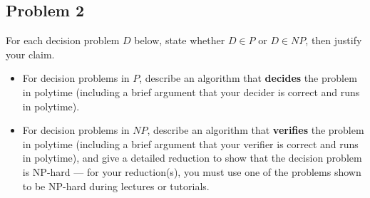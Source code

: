 \documentclass[11pt]{article}
\begin{document}
\subsection*{Problem 2}

For each decision problem $D$ below, state whether $D \in P$ or $D \in NP$, then justify your claim.
\begin{itemize}
    \item For decision problems in $P$, describe an algorithm that \textbf{decides} the problem in polytime (including a brief argument that your decider is correct and runs in polytime).
    \item For decision problems in $NP$, describe an algorithm that \textbf{verifies} the problem in polytime (including a brief argument that your verifier is correct and runs in polytime), and give a detailed reduction to show that the decision problem is NP-hard — for your reduction(s), you must use one of the problems shown to be NP-hard during lectures or tutorials.
\end{itemize}
\end{document}

